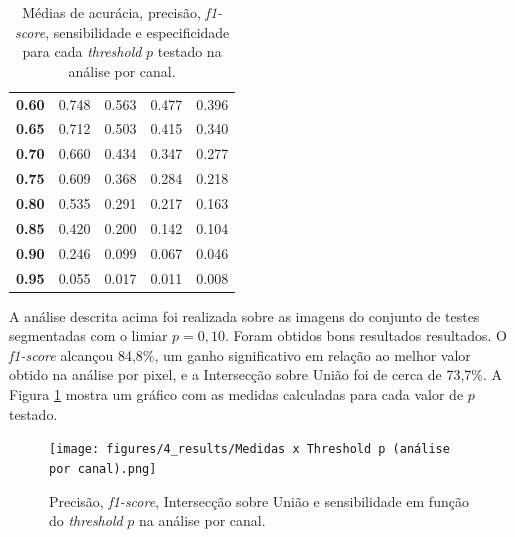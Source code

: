 \begin{table}[h]
\begin{tiny}
\begin{tabular}{|l|l|l|l|l|}
\cellcolor[HTML]{EFEFEF}\textbf{0.60}   &  0.748               & 0.563                     & 0.477                    & 0.396            \\ \cline{1-5}
\cellcolor[HTML]{EFEFEF}\textbf{0.65}   &  0.712               & 0.503                     & 0.415                    & 0.340            \\ \cline{1-5}
\cellcolor[HTML]{EFEFEF}\textbf{0.70}   &  0.660               & 0.434                     & 0.347                    & 0.277            \\ \cline{1-5}
\cellcolor[HTML]{EFEFEF}\textbf{0.75}   &  0.609               & 0.368                     & 0.284                    & 0.218            \\ \cline{1-5} 
\cellcolor[HTML]{EFEFEF}\textbf{0.80}   &  0.535               & 0.291                     & 0.217                    & 0.163            \\ \cline{1-5}
\cellcolor[HTML]{EFEFEF}\textbf{0.85}   &  0.420               & 0.200                     & 0.142                    & 0.104            \\ \cline{1-5}
\cellcolor[HTML]{EFEFEF}\textbf{0.90}   &  0.246               & 0.099                     & 0.067                    & 0.046            \\ \cline{1-5}
\cellcolor[HTML]{EFEFEF}\textbf{0.95}   &  0.055               & 0.017                     & 0.011                    & 0.008            \\ \cline{1-5}
\end{tabular}
\end{tiny}
\caption{Médias de acurácia, precisão, \textit{f1-score}, sensibilidade e especificidade para cada \textit{threshold} $p$ testado na análise por canal.}
    \label{tab:metricas-variando-p-por-canal}
\end{table}

A análise descrita acima foi realizada sobre as imagens do conjunto de testes segmentadas com o limiar \(p = 0,10\). Foram obtidos bons resultados resultados. O \textit{f1-score} alcançou 84,8\%, um ganho significativo em relação ao melhor valor obtido na análise por pixel, e a Intersecção sobre União foi de cerca de 73,7\%. A Figura \ref{fig:graphic-metrics-x-p-per-canal} mostra um gráfico com as medidas calculadas para cada valor de $p$ testado.

\begin{figure}[H]
    \center
\texttt{[image: figures/4\_results/Medidas x Threshold p (análise por canal).png]}
  
    \caption[Métricas obtidas na análise por canal.]{Precisão, \textit{f1-score}, Intersecção sobre União e sensibilidade em função do \textit{threshold} $p$ na análise por canal.}
    \label{fig:graphic-metrics-x-p-per-canal}
\end{figure}


